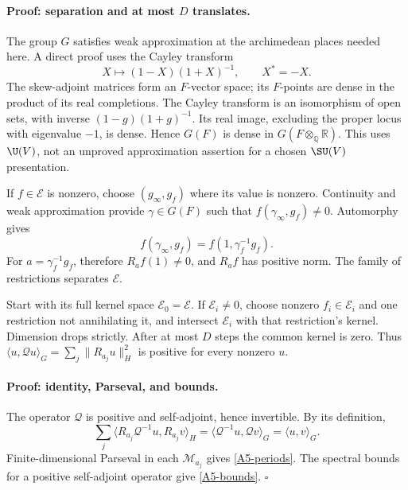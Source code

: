 \documentclass[11pt]{article}
\newcommand{\Q}{\mathbb Q}\newcommand{\C}{\mathbb C}\newcommand{\Z}{\mathbb Z}\newcommand{\R}{\mathbb R}\newcommand{\A}{\mathbb A}\newcommand{\OO}{\mathcal O}
\theoremstyle{definition}\newtheorem{definition}[theorem]{Definition}\newtheorem{remark}[theorem]{Remark}
\begin{document}
\paragraph{Proof: separation and at most $D$ translates.}
The group $G$ satisfies weak approximation at the archimedean places
needed here. A direct proof uses the Cayley transform
\[
 X\longmapsto(1-X)(1+X)^{-1},\qquad X^*=-X.
\]
The skew-adjoint matrices form an $F$-vector space; its $F$-points
are dense in the product of its real completions. The Cayley transform
is an isomorphism of open sets, with inverse
$(1-g)(1+g)^{-1}$. Its real image, excluding the proper locus with
eigenvalue $-1$, is dense. Hence $G(F)$ is dense in
$G(F\otimes_\Q\R)$. This uses $\U(V)$, not an unproved
approximation assertion for a chosen $\SU(V)$ presentation.

If $f\in\mathcal E$ is nonzero, choose $(g_\infty,g_f)$ where its
value is nonzero. Continuity and weak approximation provide
$\gamma\in G(F)$ such that $f(\gamma_\infty,g_f)\ne0$.
Automorphy gives
\[
 f(\gamma_\infty,g_f)=f(1,\gamma_f^{-1}g_f).
\]
For $a=\gamma_f^{-1}g_f$, therefore $R_af(1)\ne0$, and
$R_af$ has positive norm. The family of restrictions separates
$\mathcal E$.

Start with its full kernel space $\mathcal E_0=\mathcal E$.
If $\mathcal E_i\ne0$, choose nonzero $f_i\in\mathcal E_i$ and
one restriction not annihilating it, and intersect $\mathcal E_i$
with that restriction's kernel. Dimension drops strictly. After at
most $D$ steps the common kernel is zero. Thus
$\langle u,\mathcal Q u\rangle_G=\sum_j\|R_{a_j}u\|_H^2$
is positive for every nonzero $u$.

\paragraph{Proof: identity, Parseval, and bounds.}
The operator $\mathcal Q$ is positive and self-adjoint, hence
invertible. By its definition,
\[
 \sum_j\langle R_{a_j}\mathcal Q^{-1}u,R_{a_j}v\rangle_H
 =\langle\mathcal Q^{-1}u,\mathcal Q v\rangle_G
 =\langle u,v\rangle_G.
\]
Finite-dimensional Parseval in each $\mathcal M_{a_j}$ gives
\eqref{A5-periods}. The spectral bounds for a positive self-adjoint
operator give \eqref{A5-bounds}. $\square$
\end{document}

